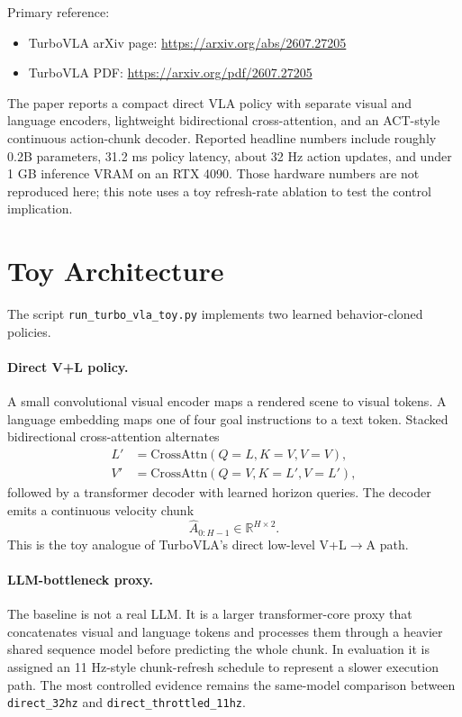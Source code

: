 \documentclass[11pt]{article}
\begin{document}
Primary reference:
\begin{itemize}[leftmargin=1.5em]
  \item TurboVLA arXiv page: \url{https://arxiv.org/abs/2607.27205}
  \item TurboVLA PDF: \url{https://arxiv.org/pdf/2607.27205}
\end{itemize}

The paper reports a compact direct VLA policy with separate visual and language encoders, lightweight bidirectional cross-attention, and an ACT-style continuous action-chunk decoder. Reported headline numbers include roughly 0.2B parameters, 31.2 ms policy latency, about 32 Hz action updates, and under 1 GB inference VRAM on an RTX 4090. Those hardware numbers are not reproduced here; this note uses a toy refresh-rate ablation to test the control implication.

\section{Toy Architecture}

The script \texttt{run\_turbo\_vla\_toy.py} implements two learned behavior-cloned policies.

\paragraph{Direct V+L policy.}
A small convolutional visual encoder maps a rendered scene to visual tokens. A language embedding maps one of four goal instructions to a text token. Stacked bidirectional cross-attention alternates
\begin{align*}
  L' &= \mathrm{CrossAttn}(Q=L, K=V, V=V), \\
  V' &= \mathrm{CrossAttn}(Q=V, K=L', V=L'),
\end{align*}
followed by a transformer decoder with learned horizon queries. The decoder emits a continuous velocity chunk
\[
  \hat{A}_{0:H-1} \in \mathbb{R}^{H \times 2}.
\]
This is the toy analogue of TurboVLA's direct low-level V+L\(\rightarrow\)A path.

\paragraph{LLM-bottleneck proxy.}
The baseline is not a real LLM. It is a larger transformer-core proxy that concatenates visual and language tokens and processes them through a heavier shared sequence model before predicting the whole chunk. In evaluation it is assigned an 11 Hz-style chunk-refresh schedule to represent a slower execution path. The most controlled evidence remains the same-model comparison between \texttt{direct\_32hz} and \texttt{direct\_throttled\_11hz}.
\end{document}
